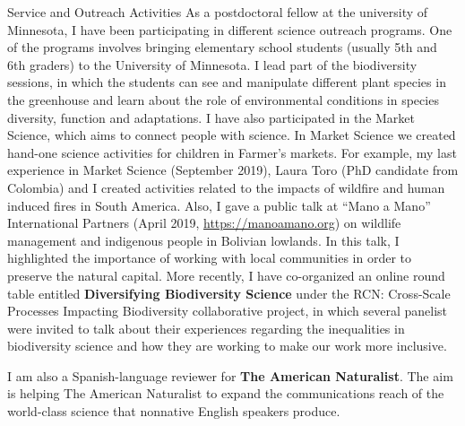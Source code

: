 \documentclass{resume} %
\begin{document}
\begin{rSection}{Service and Outreach Activities}
As a postdoctoral fellow at the university of Minnesota, I have been participating in different science outreach programs. One of the programs involves bringing elementary school students (usually 5th and 6th graders) to the University of Minnesota. I lead part of the biodiversity sessions, in which the students can see and manipulate different plant species in the greenhouse and learn about the role of environmental conditions in species diversity, function and adaptations. I have also participated in the Market Science, which aims to connect people with science. In Market Science we created hand-one science activities for children in Farmer’s markets. For example, my last experience in Market Science (September 2019), Laura Toro (PhD candidate from Colombia) and I created activities related to the impacts of wildfire and human induced fires in South America. Also, I gave a public talk at “Mano a Mano” International Partners (April 2019, \url{https://manoamano.org}) on wildlife management and indigenous people in Bolivian lowlands. In this talk, I highlighted the importance of working with local communities in order to preserve the natural capital. More recently, I have co-organized an online round table entitled {\bf Diversifying Biodiversity Science} under the RCN: Cross-Scale Processes Impacting Biodiversity collaborative project, in which several panelist were invited to talk about their experiences regarding the inequalities in biodiversity science and how they are working to make our work more inclusive.

I am also a Spanish-language reviewer for {\bf The American Naturalist}. The aim is helping The American Naturalist to expand the communications reach of the world-class science that nonnative English speakers produce.


\end{rSection}

\end{document}

